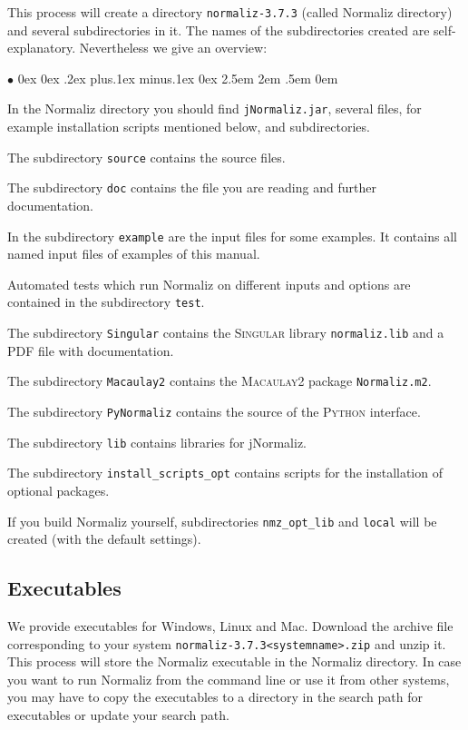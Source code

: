 \documentclass[12pt,a4paper]{scrartcl}
\newcommand{\stdli}{ \topsep0ex \partopsep0ex %
\parsep.2ex plus.1ex minus.1ex \itemsep0ex%
\leftmargin2.5em \labelwidth2em \labelsep.5em \rightmargin0em}%
\renewenvironment{itemize}{\begin{list}{{$\bullet$}}{\stdli}}{\end{list}}
\theoremstyle{definition}
\def\ttt{\texttt}
\def\version{3.7.3}
\def\NmzDir{normaliz-\version}
\begin{document}
This process will create a directory \ttt{\NmzDir} (called
Normaliz directory) and several subdirectories in
it. The names of the subdirectories created are
self-explanatory. Nevertheless we give an overview:
\begin{itemize}
\item In the Normaliz directory you should
find \ttt{jNormaliz.jar}, several files, for example installation scripts mentioned below,  and
subdirectories.

\item The subdirectory \ttt{source} contains the source files.

\item The subdirectory \ttt{doc} contains the file you are reading 
and further documentation.

\item In the subdirectory \ttt{example} are the input
files for some examples. It contains all named
input files of examples of this manual.

\item Automated tests which run Normaliz on different inputs
and options are contained in the subdirectory \ttt{test}.

\item The subdirectory \ttt{Singular} contains the
\textsc{Singular} library \ttt{normaliz.lib} and a PDF file with
documentation.

\item The subdirectory \ttt{Macaulay2} contains the
\textsc{Macaulay2} package \ttt{Normaliz.m2}.

\item The subdirectory \ttt{PyNormaliz} contains the source of the
\textsc{Python} interface.

\item The subdirectory \ttt{lib} contains libraries for
jNormaliz.

\item The subdirectory \verb|install_scripts_opt| contains scripts for the installation of optional packages.
\end{itemize}

If you build Normaliz yourself, subdirectories \verb|nmz_opt_lib| and \verb|local| will be created (with the default settings).

\subsection{Executables}

We provide executables for Windows, Linux and Mac. Download the archive file
corresponding to your system \ttt{\NmzDir<systemname>.zip}
and unzip it. This process will store the Normaliz executable in the Normaliz directory. In case you want to run Normaliz from the
command line or use it from other systems, you may have to copy
the executables to a directory in the search path for
executables or update your search path.
\end{document}
